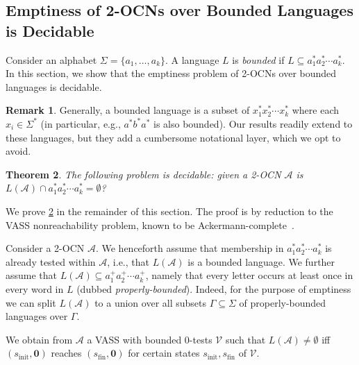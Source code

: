 \documentclass[11pt,a4paper]{amsart}
\newtheorem{theorem}{Theorem}
\theoremstyle{definition}
\newtheorem{remark}[theorem]{Remark}
\newcommand{\shtodo}[1]{\todo[color=cyan!25,size=\small]{SH: #1}}
\renewcommand{\vec}[1]{\boldsymbol{#1}}
\newcommand{\cA}{\mathcal{A}}
\newcommand{\cV}{\mathcal{V}}
\begin{document}
\subsection{Emptiness of 2-OCNs over Bounded Languages is Decidable}
\label{sec:bounded_languages}
\label{sec:2OCN_Bounded_to_VASS_intuitive} 
Consider an alphabet $\Sigma=\{a_1,\ldots,a_k\}$. A language $L$ is \emph{bounded} if $L\subseteq
a_1^*a_2^*\cdots a_k^*$. In this section, we show that the emptiness problem of
2-OCNs over bounded languages is decidable.
\begin{remark} %
	Generally, a bounded language is a subset of $x_1^*x_2^*\cdots x_k^*$ where each
	$x_i\in \Sigma^*$ (in particular, e.g., $a^*b^*a^*$ is also bounded). Our results
	readily extend to these languages, but they add a cumbersome notational
	layer, which we opt to avoid.
\end{remark}
\begin{theorem}
	\label{thm:emptiness_bounded_decidable} The following problem is decidable:
	given a 2-OCN $\cA$ is $L(\cA)\cap a_1^*a_2^*\cdots a_k^* = \emptyset$?
\end{theorem} 
We prove \cref{thm:emptiness_bounded_decidable} in the remainder of this section. The proof is by reduction to the VASS nonreachability problem, known to be
Ackermann-complete~\cite{czerwinski2022reachability}. 

Consider a 2-OCN $\cA$. We henceforth assume that membership in $a_1^*a_2^*\cdots a_k^*$ is already
tested within $\cA$, i.e., that $L(\cA)$ is a bounded language. We further assume
that $L(\cA)\subseteq a_1^+a_2^+\cdots a_k^+$, namely that every letter occurs at least once
in every word in $L$ (dubbed \emph{properly-bounded}). Indeed, for the purpose
of emptiness we can split $L(\cA)$ to a union over all subsets $\Gamma\subseteq \Sigma$ of
properly-bounded languages over $\Gamma$.

We obtain from $\cA$ a VASS with bounded 0-tests $\cV$ such that $L(\cA)\neq \emptyset$ iff
$(s_{\textrm{init}},\vec{0})$ reaches $(s_{\textrm{fin}},\vec{0})$ for certain
states $s_{\textrm{init}},s_{\textrm{fin}}$ of $\cV$.
\end{document}
